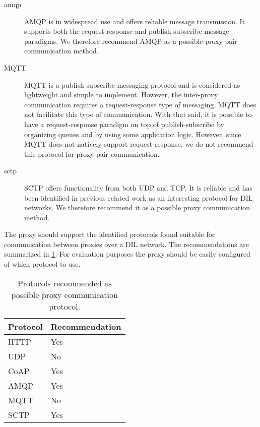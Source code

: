 \begin{description}
	\item[\gls{amqp}] AMQP is in widespread use and offers reliable message
	transmission. It supports both the request-response and publish-subscribe
	message paradigms. We therefore recommend AMQP as a possible proxy pair
	communication method.

	\item[MQTT] MQTT is a publish-subscribe messaging protocol and is considered
	as lightweight and simple to implement. However, the inter-proxy
	communication requires a request-response type of messaging. MQTT does not
	facilitate this type of communication. With that said, it is possible to
	have a request-response paradigm on top of publish-subscribe by organizing
	queues and by using some application logic. However, since MQTT does not
	natively support request-response, we do not recommend this protocol for
	proxy pair communication.

	\item[\gls{sctp}] SCTP offers functionality from both UDP and TCP. It is
	reliable and has been identified in previous related work as an interesting
	protocol for DIL networks. We therefore recommend it as a possible proxy
	communication method.

\end{description}

The proxy should support the identified protocols found suitable for
communication between proxies over a DIL network. The recommendations are
summarized in \cref{table:possible-proxy-protocols}. For evaluation purposes the
proxy should be easily configured of which protocol to use.

\begin{table}[h]
\begin{tabularx}{\textwidth}{| X | X |}
\hline
  \textbf{Protocol} & \textbf{Recommendation} \\ \hline
  HTTP & Yes \\ \hline
  UDP & No \\ \hline
  CoAP & Yes \\ \hline
  AMQP & Yes \\ \hline
  MQTT & No \\ \hline
  SCTP & Yes \\ \hline
\end{tabularx}
\caption{Protocols recommended as possible proxy communication protocol.}
\label{table:possible-proxy-protocols}
\end{table}



